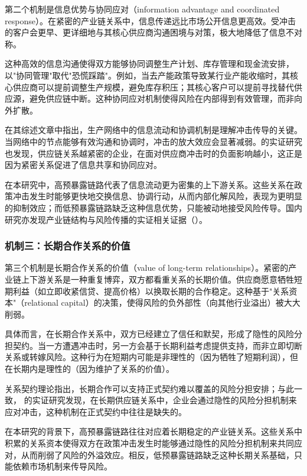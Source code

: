 第二个机制是信息优势与协同应对（information advantage and coordinated response）。在紧密的产业链关系中，信息传递远比市场公开信息更高效。受冲击的客户会更早、更详细地与其核心供应商沟通困境与对策，极大地降低了信息不对称。

这种高效的信息沟通使得双方能够协同调整生产计划、库存管理和现金流安排，以"协同管理"取代"恐慌踩踏"。例如，当去产能政策导致某行业产能收缩时，其核心供应商可以提前调整生产规模，避免库存积压；其核心客户可以提前寻找替代供应源，避免供应链中断。这种协同应对机制使得风险在内部得到有效管理，而非向外扩散。

\citet{carvalho2014micro}在其综述文章中指出，生产网络中的信息流动和协调机制是理解冲击传导的关键。当网络中的节点能够有效沟通和协调时，冲击的放大效应会显著减弱。\citet{barrot2016input}的实证研究也发现，供应链关系越紧密的企业，在面对供应商冲击时的负面影响越小，这正是因为紧密关系促进了信息共享和协同应对。

在本研究中，高预暴露链路代表了信息流动更为密集的上下游关系。这些关系在政策冲击发生时能够更快地交换信息、协调行动，从而内部化解风险，表现为更明显的抑制效应；而低预暴露链路缺乏这种信息优势，只能被动地接受风险传导。国内研究亦发现产业链结构与风险传播的实证相关证据（\citep{Yang2023TailRiskIO,Zhao2023DigitalInputNetwork}）。

\subsubsection*{机制三：长期合作关系的价值}

第三个机制是长期合作关系的价值（value of long-term relationships）。紧密的产业链上下游关系是一种重复博弈，双方都看重关系的长期价值。供应商愿意牺牲短期利益（如立即收紧信贷、提高价格）以换取长期的合作稳定。这种基于"关系资本"（relational capital）的决策，使得风险的负外部性（向其他行业溢出）被大大削弱。

具体而言，在长期合作关系中，双方已经建立了信任和默契，形成了隐性的风险分担契约。当一方遭遇冲击时，另一方会基于长期利益考虑提供支持，而非立即切断关系或转嫁风险。这种行为在短期内可能是非理性的（因为牺牲了短期利润），但在长期内是理性的（因为维护了关系的价值）。

关系契约理论指出，长期合作可以支持正式契约难以覆盖的风险分担安排；与此一致，\citet{macchiavello2015relational} 的实证研究发现，在长期供应链关系中，企业会通过隐性的风险分担机制来应对冲击，这种机制在正式契约中往往是缺失的。

在本研究的背景下，高预暴露链路往往对应着长期稳定的产业链关系。这些关系中积累的关系资本使得双方在政策冲击发生时能够通过隐性的风险分担机制来共同应对，从而削弱了风险的外溢效应。相反，低预暴露链路缺乏这种长期关系基础，只能依赖市场机制来传导风险。

